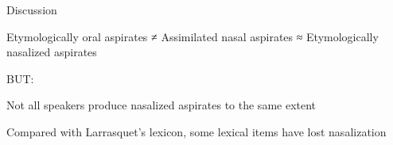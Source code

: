 \documentclass[
  ignorenonframetext,
]{beamer}
\begin{document}
\begin{frame}{Discussion}
\protect\hypertarget{discussion}{}
\begin{block}{}
\protect\hypertarget{section}{}
Etymologically oral aspirates ≠ Assimilated nasal aspirates ≈
Etymologically nasalized aspirates

BUT:

Not all speakers produce nasalized aspirates to the same extent

Compared with Larrasquet's lexicon, some lexical items have lost
nasalization
\end{block}
\end{frame}
\end{document}
